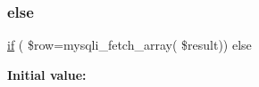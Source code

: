 \subsubsection{\texorpdfstring{else}{else}}
{\footnotesize\ttfamily \mbox{\hyperlink{connection_01_071_08_8php_a43dd02ab50145011973ca5e9cd22acd8}{if}} ( \$row=mysqli\+\_\+fetch\+\_\+array( \$result)) else}

{\bfseries Initial value\+:}
\begin{DoxyCode}{0}
\DoxyCodeLine{\{}

\end{DoxyCode}
